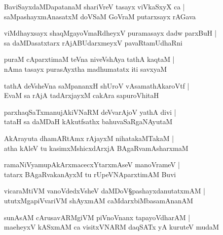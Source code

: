 \begin{shloka}
BaviSayxdaMDapatanaM shariVreV tasayx viVkaSxyX ca |\\
saMpashayxmAnasatxM doVSaM GoVraM putarxsayx rAGava
\end{shloka}

\begin{shloka}
viMdhayxsayx shaqMgayoVmaRdheyxV puramasayx dadw parxBuH |\\
sa daMDasatxtarx rAjABUdarxmeyxV pavaRtamUdhaRni
\end{shloka}

\begin{shloka}
puraM cAparxtimaM teVna niveVshAya tathA kaqtaM |\\
nAma tasayx purasAyxtha madhumatatx iti savxyaM 
\end{shloka}

\begin{shloka}
tathA deVsheVna saMpananxH shUroV vAsamathAkaroVtf |\\
EvaM sa rAjA tadArxjayxM cakAra sapuroVhitaH 
\end{shloka}

\begin{shloka}
parxhaqSaTxmanujAkiVNaRM deVvarAjoV yathA divi |\\
tataH sa daMDaH kAkutfsathx bahuvaSaRgaNAyutaM 
\end{shloka}

\begin{shloka}
AkArayuta dhamARtAmx rAjayxM nihatakaMTakaM |\\
atha kAleV tu kasimxMshicxdArxjA BAgaRvamAsharxmaM 
\end{shloka}

\begin{shloka}
ramaNiVyamupAkArxmacecxYtarxmAseV manoVrameV |\\
tatarx BAgaRvakanAyxM tu rUpeVNAparxtimAM Buvi
\end{shloka}

\begin{shloka}
vicaraMtiVM vanoVdedxVsheV daMDoV\S pashayxdanutatxmAM |\\
ututxMgapiVvariVM shAyxmAM caMdarxbiMbasamAnanAM 
\end{shloka}

\begin{shloka}
sunAsAM cArusavARMgiVM piVnoVnanx tapayoVdharAM |\\
maeheyxV kASxmAM ca visitxVNARM daqSATx yA kuruteV mudaM 
\end{shloka}

